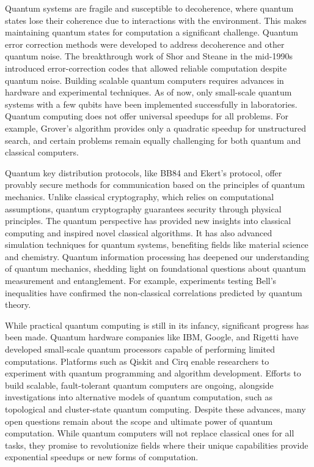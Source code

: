 \documentclass[11pt]{article}
\theoremstyle{definition}
\begin{document}
Quantum systems are fragile and susceptible to decoherence, where quantum states lose their coherence due to interactions with the environment. This makes maintaining quantum states for computation a significant challenge. Quantum error correction methods were developed to address decoherence and other quantum noise. The breakthrough work of Shor and Steane in the mid-1990s introduced error-correction codes that allowed reliable computation despite quantum noise. Building scalable quantum computers requires advances in hardware and experimental techniques. As of now, only small-scale quantum systems with a few qubits have been implemented successfully in laboratories. Quantum computing does not offer universal speedups for all problems. For example, Grover’s algorithm provides only a quadratic speedup for unstructured search, and certain problems remain equally challenging for both quantum and classical computers.

Quantum key distribution protocols, like BB84 and Ekert’s protocol, offer provably secure methods for communication based on the principles of quantum mechanics. Unlike classical cryptography, which relies on computational assumptions, quantum cryptography guarantees security through physical principles. The quantum perspective has provided new insights into classical computing and inspired novel classical algorithms. It has also advanced simulation techniques for quantum systems, benefiting fields like material science and chemistry. Quantum information processing has deepened our understanding of quantum mechanics, shedding light on foundational questions about quantum measurement and entanglement. For example, experiments testing Bell’s inequalities have confirmed the non-classical correlations predicted by quantum theory.

While practical quantum computing is still in its infancy, significant progress has been made. Quantum hardware companies like IBM, Google, and Rigetti have developed small-scale quantum processors capable of performing limited computations. Platforms such as Qiskit and Cirq enable researchers to experiment with quantum programming and algorithm development. Efforts to build scalable, fault-tolerant quantum computers are ongoing, alongside investigations into alternative models of quantum computation, such as topological and cluster-state quantum computing. Despite these advances, many open questions remain about the scope and ultimate power of quantum computation. While quantum computers will not replace classical ones for all tasks, they promise to revolutionize fields where their unique capabilities provide exponential speedups or new forms of computation.
\end{document}
